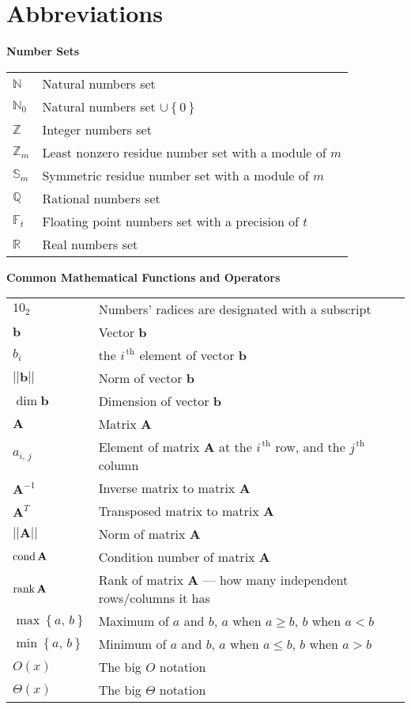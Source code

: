 \chapter{Abbreviations}

\textbf{Number Sets}\\

\begin{tabular}{ll}
{$\mathbb N$} & Natural numbers set\\
{$\mathbb N_0$} & Natural numbers set $\cup\left\{0\right\}$\\
{$\mathbb Z$} & Integer numbers set\\
{$\mathbb Z_m$} & Least nonzero residue number set with a module of $m$\\
{$\mathbb S_m$} & Symmetric residue number set with a module of $m$\\
{$\mathbb Q$} & Rational numbers set\\
{$\mathbb F_t$} & Floating point numbers set with a precision of $t$\\
{$\mathbb R$} & Real numbers set
\end{tabular}
\vskip 1cm

\noindent\textbf{Common Mathematical Functions and Operators}\\

\begin{tabular}{ll}
$10_2$ & Numbers' radices are designated with a subscript \\
${\mathbf b}$ & Vector $\mathbf b$\\
$b_{i}$ & the $i^{\,\mathrm{th}}$ element of vector $\mathbf b$\\
${||\mathbf b||}$ & Norm of vector $\mathbf b$\\
$\dim \mathbf b$ & Dimension of vector $\mathbf b$\\
${\mathbf A}$ & Matrix $\mathbf A$\\
$a_{i,\,j}$ & Element of matrix $\mathbf A$ at the $i^{\,\mathrm{th}}$ row, and the $j^{\,\mathrm{th}}$ column\\
${\mathbf A^{-1}}$ & Inverse matrix to matrix $\mathbf A$\\
${\mathbf A^T}$ & Transposed matrix to matrix $\mathbf A$\\
${||\mathbf A||}$ & Norm of matrix $\mathbf A$\\
$\mathop{\mathrm{cond}}\nolimits \mathbf A$ & Condition number of matrix $\mathbf A$\\
$\mathop{\mathrm{rank}}\nolimits \mathbf A$ & Rank of matrix $\mathbf A$ --- how many independent rows/columns it has\\
$\max\left\{a,\,b\right\}$ & Maximum of $a$ and $b$, $a$ when $a\geq b$, $b$ when $a<b$\\
$\min\left\{a,\,b\right\}$ & Minimum of $a$ and $b$, $a$ when $a\leq b$, $b$ when $a>b$\\
$O(x)$ & The big $O$ notation\\
$\Theta(x)$ & The big $\Theta$ notation\\
\end{tabular}
\newpage

